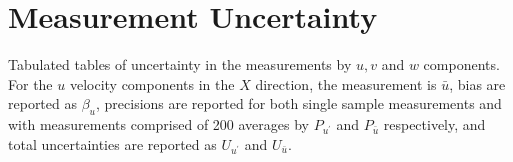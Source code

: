 
\chapter{Measurement Uncertainty}

Tabulated tables of uncertainty in the measurements by $u, v$ and $w$ 
components. For the $u$ velocity components in the $X$ direction, the 
measurement is $\bar{u}$, bias are reported as $\beta_u$, precisions are 
reported for both single sample measurements and with measurements comprised of 
200 averages by $P_{u^\prime}$ and $P_{\bar{u}}$ respectively, and total 
uncertainties are reported as $U_{u^\prime}$ and $U_{\bar{u}}$.











